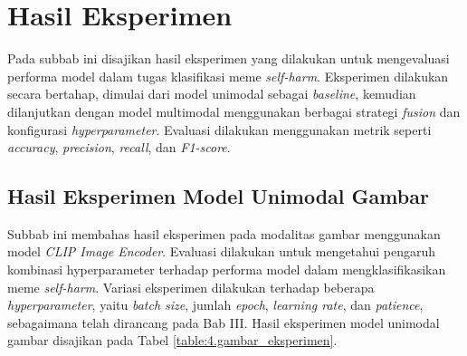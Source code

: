 \section{Hasil Eksperimen} \label{IV.Eksperimen}
Pada subbab ini disajikan hasil eksperimen yang dilakukan untuk mengevaluasi performa model dalam tugas klasifikasi meme \textit{self-harm}. Eksperimen dilakukan secara bertahap, dimulai dari model unimodal sebagai \textit{baseline}, kemudian dilanjutkan dengan model multimodal menggunakan berbagai strategi \textit{fusion} dan konfigurasi \textit{hyperparameter}. Evaluasi dilakukan menggunakan metrik seperti \textit{accuracy}, \textit{precision}, \textit{recall}, dan \textit{F1-score}.


\subsection{Hasil Eksperimen Model Unimodal Gambar}
\label{IV.Eksperimen.Gambar}

Subbab ini membahas hasil eksperimen pada modalitas gambar menggunakan model \textit{CLIP Image Encoder}. Evaluasi dilakukan untuk mengetahui pengaruh kombinasi hyperparameter terhadap performa model dalam mengklasifikasikan meme \textit{self-harm}.
Variasi eksperimen dilakukan terhadap beberapa \textit{hyperparameter}, yaitu \textit{batch size}, jumlah \textit{epoch}, \textit{learning rate}, dan \textit{patience}, sebagaimana telah dirancang pada Bab III. Hasil eksperimen model unimodal gambar disajikan pada Tabel \ref{table:4.gambar_eksperimen}.





